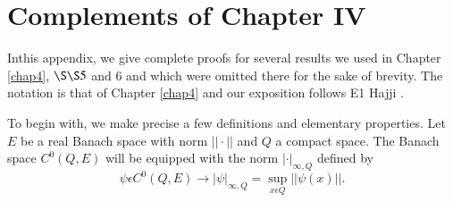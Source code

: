 
\makeatletter

\def\@makechapterhead#1{%
  \vspace*{50\p@}%
  {\parindent \z@ \raggedright \normalfont
    \ifnum \c@secnumdepth >\m@ne
      \if@mainmatter
        \huge\bfseries Appendix\space \thechapter
       \par\nobreak
        \vskip 20\p@
      \fi
    \fi
    \interlinepenalty\@M
    \Huge \bfseries #1 \par\nobreak
    \vskip 40\p@
  }}

\renewcommand\thesection{\@Alph\thechapter.\@arabic\c@section}

\def\@chapter[#1]#2{\ifnum \c@secnumdepth >\m@ne
                       \if@mainmatter
                         \refstepcounter{chapter}%
                         \typeout{\@chapapp\space\thechapter.}%
                         \addcontentsline{toc}{chapter}%
                                   {\protect\numberline{}
                          Appendix 2: #1}%
                       \else
                         \addcontentsline{toc}{chapter}{#1}%
                       \fi
                    \else
                      \addcontentsline{toc}{chapter}{#1}%
                    \fi
                    \chaptermark{#1}%
                    \addtocontents{lof}{\protect\addvspace{10\p@}}%
                    \addtocontents{lot}{\protect\addvspace{10\p@}}%
                    \if@twocolumn
                      \@topnewpage[\@makechapterhead{#2}]%
                    \else
                      \@makechapterhead{#2}%
                      \@afterheading
                    \fi}

\makeatother

\chapter{Complements of Chapter IV}


In\pageoriginale this appendix, we give complete proofs for several results we used in Chapter \ref{chap4}, $\S \S 5$ and 6 and which were omitted there for the sake of brevity. The notation is that of Chapter \ref{chap4} and our exposition follows E1 Hajji \cite{10}.

To begin with, we make precise a few definitions and elementary properties. Let $E$ be a real Banach space with norm $|| \cdot ||$ and $Q$ a compact space. The Banach space $C^{0} (Q, E)$ will be equipped with the norm $| \cdot |_{\infty, Q}$ defined by
$$
\psi \epsilon C^{0} (Q, E) \to |\psi|_{\infty, Q} = \sup_{x \epsilon
  Q} ||\psi(x)||. 
$$


